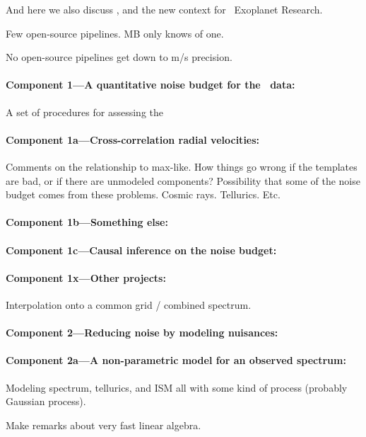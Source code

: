 \documentclass[12pt, fullpage, letterpaper]{article}
\begin{document}
And here we also discuss \NNEXPLORE, and the new context for
\NASA\ Exoplanet Research.

Few open-source pipelines. MB only knows of one.

No open-source pipelines get down to m/s precision.

\paragraph{Component 1---A quantitative noise budget for the \HARPS\ data:}
A set of procedures for assessing the 

\paragraph{Component 1a---Cross-correlation radial velocities:}
Comments on the relationship to max-like. How things go wrong
if the templates are bad, or if there are unmodeled components?
Possibility that some of the noise budget comes from these
problems. Cosmic rays. Tellurics. Etc.

\paragraph{Component 1b---Something else:}

\paragraph{Component 1c---Causal inference on the noise budget:}

\paragraph{Component 1x---Other projects:}
Interpolation onto a common grid / combined spectrum.

\paragraph{Component 2---Reducing noise by modeling nuisances:}

\paragraph{Component 2a---A non-parametric model for an observed spectrum:}
Modeling spectrum, tellurics, and ISM all with some kind of
process (probably Gaussian process).

Make remarks about very fast linear algebra.
\end{document}
